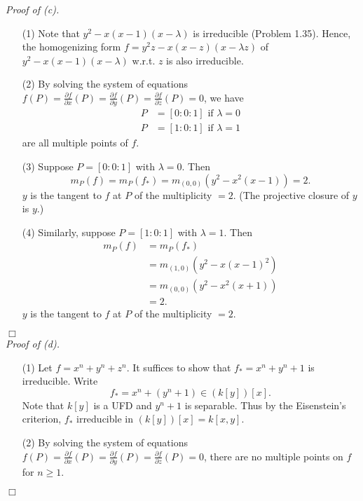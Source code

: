 \documentclass{article}
\begin{document}
\emph{Proof of (c).}
\begin{enumerate}
\item[(1)]
  Note that $y^2 - x(x-1)(x-\lambda)$ is irreducible (Problem 1.35).
  Hence, the homogenizing form $f = y^2z - x(x-z)(x-\lambda z)$ of
  $y^2 - x(x-1)(x-\lambda)$ w.r.t. $z$ is also irreducible.

\item[(2)]
  By solving the system of equations
  $f(P)
  = \frac{\partial f}{\partial x}(P)
  = \frac{\partial f}{\partial y}(P)
  = \frac{\partial f}{\partial z}(P) = 0$,
  we have
  \begin{align*}
    P &= [0:0:1] \text{ if } \lambda = 0 \\
    P &= [1:0:1] \text{ if } \lambda = 1
  \end{align*}
  are all multiple points of $f$.

\item[(3)]
  Suppose $P = [0:0:1]$ with $\lambda = 0$.
  Then
  \[
    m_P(f) = m_P(f_{*}) = m_{(0,0)}(y^2 - x^2(x-1)) = 2.
  \]
  $y$ is the tangent to $f$ at $P$ of the multiplicity $= 2$.
  (The projective closure of $y$ is $y$.)

\item[(4)]
  Similarly, suppose $P = [1:0:1]$ with $\lambda = 1$.
  Then
  \begin{align*}
    m_P(f)
    &= m_P(f_{*}) \\
    &= m_{(1,0)}(y^2 - x(x-1)^2) \\
    &= m_{(0,0)}(y^2 - x^2(x+1)) \\
    &= 2.
  \end{align*}
  $y$ is the tangent to $f$ at $P$ of the multiplicity $= 2$.
\end{enumerate}
$\Box$ \\



\emph{Proof of (d).}
\begin{enumerate}
\item[(1)]
  Let $f = x^n + y^n + z^n$.
  It suffices to show that $f_{*} = x^n + y^n + 1$ is irreducible.
  Write
  \[
    f_{*} = x^n + (y^n + 1) \in (k[y])[x].
  \]
  Note that $k[y]$ is a UFD and $y^n + 1$ is separable.
  Thus by the Eisenstein's criterion, $f_{*}$ irreducible in $(k[y])[x] = k[x,y]$.

\item[(2)]
  By solving the system of equations
  $f(P)
  = \frac{\partial f}{\partial x}(P)
  = \frac{\partial f}{\partial y}(P)
  = \frac{\partial f}{\partial z}(P) = 0$,
  there are no multiple points on $f$ for $n \geq 1$.
\end{enumerate}
$\Box$ \\\\
\end{document}
